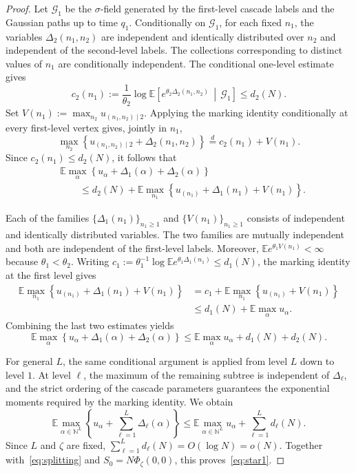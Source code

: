 \documentclass[a4paper,10pt,reqno]{amsart}
\numberwithin{equation}{section}
\newcommand{\dN}{\mathbb{N}}%
\newcommand{\dE}{\mathbb{E}}%
\begin{document}
\begin{proof}
		Let $\mathcal G_1$ be the $\sigma$-field generated by the
		first-level cascade labels and the Gaussian paths up to time
		$q_1$. Conditionally on $\mathcal G_1$, for each fixed $n_1$,
		the variables $\Delta_2(n_1,n_2)$ are independent and identically
		distributed over $n_2$ and independent of the second-level
		labels. The collections corresponding to distinct values of
		$n_1$ are conditionally independent. The conditional one-level
		estimate gives
		\[
		c_2(n_1)
		:=
		\frac1{\theta_2}
		\log
		\dE\left[
		e^{\theta_2\Delta_2(n_1,n_2)}
		\,\middle|\,
		\mathcal G_1
		\right]
		\le d_2(N).
		\]
		Set $V(n_1):=\max_{n_2}u_{(n_1,n_2)\mid2}$. Applying the
		marking identity conditionally at every first-level vertex gives,
		jointly in $n_1$,
		\[
		\max_{n_2}
		\left\{
		u_{(n_1,n_2)\mid2}+\Delta_2(n_1,n_2)
		\right\}
		\stackrel d=
		c_2(n_1)+V(n_1).
		\]
		Since $c_2(n_1)\le d_2(N)$, it follows that
		\[
		\begin{aligned}
			&\dE\max_{\alpha}
			\left\{
			u_\alpha+\Delta_1(\alpha)+\Delta_2(\alpha)
			\right\}
			\\
			&\qquad\le
			d_2(N)
			+
			\dE\max_{n_1}
			\left\{
			u_{(n_1)}+\Delta_1(n_1)+V(n_1)
			\right\}.
		\end{aligned}
		\]
		
		Each of the families $\{\Delta_1(n_1)\}_{n_1\ge1}$ and
		$\{V(n_1)\}_{n_1\ge1}$ consists of independent and identically
		distributed variables. The two families are mutually independent
		and both are independent of the first-level labels. Moreover,
		$\dE e^{\theta_1V(n_1)}<\infty$ because
		$\theta_1<\theta_2$. Writing
		$c_1:=\theta_1^{-1}\log\dE e^{\theta_1\Delta_1(n_1)}
		\le d_1(N)$, the marking identity at the first level gives
		\[
		\begin{aligned}
			\dE\max_{n_1}
			\left\{
			u_{(n_1)}+\Delta_1(n_1)+V(n_1)
			\right\}
			&=
			c_1+
			\dE\max_{n_1}
			\left\{
			u_{(n_1)}+V(n_1)
			\right\}
			\\
			&\le
			d_1(N)+\dE\max_\alpha u_\alpha.
		\end{aligned}
		\]
		Combining the last two estimates yields
		\[
		\dE\max_{\alpha}
		\left\{
		u_\alpha+\Delta_1(\alpha)+\Delta_2(\alpha)
		\right\}
		\le
		\dE\max_\alpha u_\alpha+d_1(N)+d_2(N).
		\]
		
		For general $L$, the same conditional argument is applied from
		level $L$ down to level $1$. At level $\ell$, the maximum of the
		remaining subtree is independent of $\Delta_\ell$, and the strict
		ordering of the cascade parameters guarantees the exponential
		moments required by the marking identity. We obtain
		\[
		\dE
		\max_{\alpha\in\dN^L}
		\left\{
		u_\alpha+\sum_{\ell=1}^L \Delta_\ell(\alpha)
		\right\}
		\le
		\dE\max_{\alpha\in\dN^L}u_\alpha
		+
		\sum_{\ell=1}^L d_\ell(N).
		\]
		Since $L$ and $\zeta$ are fixed,
		$\sum_{\ell=1}^L d_\ell(N)=O(\log N)=o(N)$. Together with~\eqref{eq:splitting}
		and $S_0=N\Phi_\zeta(0,0)$, this
		proves~\eqref{eq:star1}.
	\end{proof}
	
\end{document}
